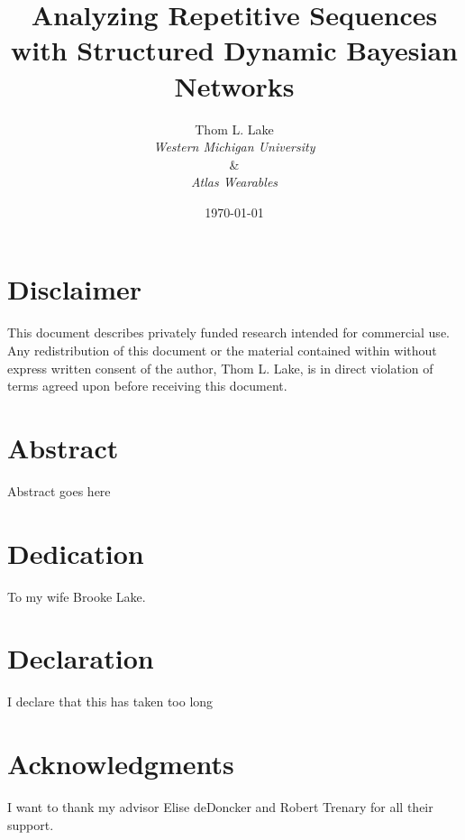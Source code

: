 \documentclass[12pt]{report}
\author{Thom L. Lake\\\normalsize{\emph{Western Michigan University}}\\\&\\\normalsize{\emph{Atlas Wearables}}}
\title{Analyzing Repetitive Sequences with Structured Dynamic Bayesian Networks}
\date{\yyyymmdddate\today}
\newcommand{\1}[0]{\mathbbm{1}}
\begin{document}
\maketitle

\chapter*{Disclaimer}
This document describes privately funded research intended
for commercial use. Any redistribution of this document or the material
contained within without express written consent of the author, Thom L. Lake,
is in direct violation of terms agreed upon before receiving this document.

\chapter*{Abstract}
Abstract goes here

\chapter*{Dedication}
To my wife Brooke Lake.

\chapter*{Declaration}
I declare that this has taken too long

\chapter*{Acknowledgments}
I want to thank my advisor Elise deDoncker and Robert Trenary for all their support.


\tableofcontents

\cleardoublepage
{}
\listoffigures

\cleardoublepage
{}
\listoftables

\cleardoublepage
{}
\end{document}
